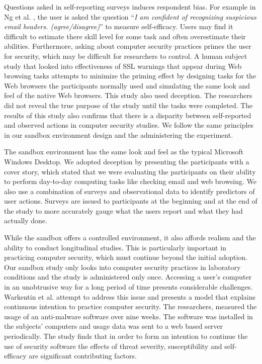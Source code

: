 Questions asked in self-reporting surveys induces respondent bias. For example in Ng et al.  \citeyear{ng2007}, the user is asked the question ``\textit{I am confident of recognizing suspicious email headers. (agree/disagree)}'' to measure self-efficacy. 
Users may find it difficult to estimate there skill level for some task and often overestimate their abilities. 
Furthermore, asking about computer security practices primes the user for security, which may be difficult for researchers to control. A human subject study that looked into effectiveness of SSL warnings that appear during Web browsing tasks \cite{sotirakopoulos2011} attempts to minimize the priming effect by designing tasks for the Web browsers the participants normally used and simulating the same look and feel of the native Web browsers. This study also used deception. The researchers did not reveal the true purpose of the study until the tasks were completed. The results of this study also confirms that there is a disparity between self-reported  and observed actions in computer security studies. We follow the same principles in our sandbox environment design and the administering the experiment. 

The sandbox environment has the same look and feel as the typical Microsoft Windows Desktop. We adopted deception by presenting the participants with a cover story, which stated that we were evaluating the participants on their ability to perform day-to-day computing tasks like checking email and web browsing. We also use a combination of surveys and observational data to identify predictors of user actions. Surveys are issued to participants at the beginning and at the end of the study to more accurately gauge what the users report and what they had actually done.

While the sandbox offers a controlled environment, it also affords realism and the ability to conduct longitudinal studies. 
This is particularly important in practicing computer security, which must continue beyond the initial adoption. 
Our sandbox study only looks into computer security practices in laboratory conditions and the study is administered only once. 
Accessing a user's computer in an unobtrusive way for a long period of time presents considerable challenges. Warkentin et al. \citeyear{warkentin2016} attempt to address this issue and presents a model that explains continuous intention to practice computer security. The researchers, measured the usage of an anti-malware software over nine weeks. The software was installed in the subjects' computers and usage data was sent to a web based server periodically. The study finds that in order to form an intention to continue the use of security software the effects of threat severity, susceptibility and self-efficacy are significant contributing factors.

